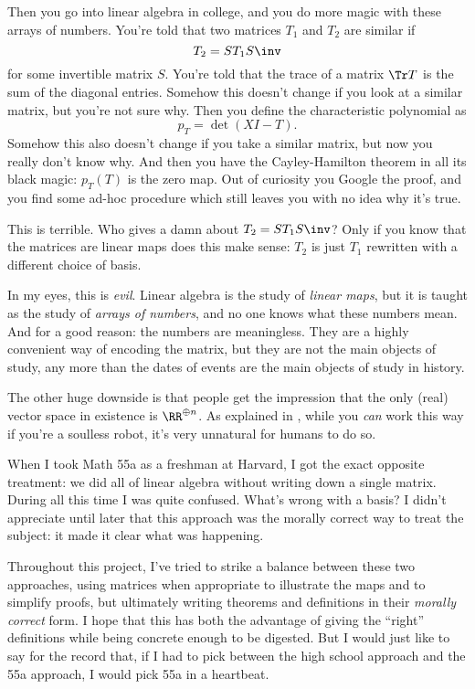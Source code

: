 Then you go into linear algebra in college, and you do more magic
with these arrays of numbers.
You're told that two matrices $T_1$ and $T_2$ are similar if
\[ T_2 = ST_1S\inv \] for some invertible matrix $S$.
You're told that the trace of a matrix $\Tr T$ is the sum of the diagonal entries.
Somehow this doesn't change if you look at a similar matrix,
but you're not sure why.
Then you define the characteristic polynomial as \[ p_T = \det (XI - T). \]
Somehow this also doesn't change if you take a similar matrix,
but now you really don't know why.
And then you have the Cayley-Hamilton theorem in all its black magic:
$p_T(T)$ is the zero map.  Out of curiosity you Google the proof,
and you find some ad-hoc procedure which still leaves you
with no idea why it's true.

This is terrible. Who gives a damn about $T_2 = ST_1S\inv$?
Only if you know that the matrices are linear maps does this make sense:
$T_2$ is just $T_1$ rewritten with a different choice of basis.

In my eyes, this is \emph{evil}.
Linear algebra is the study of \emph{linear maps},
but it is taught as the study of \emph{arrays of numbers},
and no one knows what these numbers mean.
And for a good reason: the numbers are meaningless.
They are a highly convenient way of encoding the matrix,
but they are not the main objects of study,
any more than the dates of events are the main objects of study in history.

The other huge downside is that people get the impression
that the only (real) vector space in existence is $\RR^{\oplus n}$.
As explained in ,
while you \emph{can} work this way if you're a soulless robot,
it's very unnatural for humans to do so.

When I took Math 55a as a freshman at Harvard,
I got the exact opposite treatment:
we did all of linear algebra without writing down a single matrix.
During all this time I was quite confused.
What's wrong with a basis?
I didn't appreciate until later that this approach was the
morally correct way to treat the subject: it made it clear what was happening.

Throughout this project, I've tried to strike a balance between these
two approaches, using matrices when appropriate to illustrate
the maps and to simplify proofs, but ultimately writing
theorems and definitions in their \emph{morally correct} form.
I hope that this has both the advantage of giving the ``right'' definitions
while being concrete enough to be digested.
But I would just like to say for the record that,
if I had to pick between the high school approach and the 55a approach,
I would pick 55a in a heartbeat.

